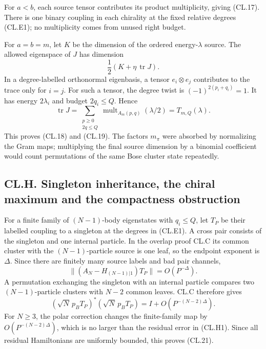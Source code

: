 For \(a<b\), each source tensor contributes its product multiplicity, giving (CL.17). There is one binary coupling in each chirality at the fixed relative degrees (CL.E1); no multiplicity comes from unused right budget.

For \(a=b=m\), let \(K\) be the dimension of the ordered energy-\(\lambda\) source. The allowed eigenspace of \(J\) has dimension \[
\frac12(K+\eta\,\operatorname{tr}J).
\] In a degree-labelled orthonormal eigenbasis, a tensor \(e_i\otimes e_j\) contributes to the trace only for \(i=j\). For such a tensor, the degree twist is \((-1)^{2(p_i+q_i)}=1\). It has energy \(2\lambda_i\) and budget \(2q_i\leq Q\). Hence \[
\operatorname{tr}J
=\sum_{\substack{p\geq0\\2q\leq Q}}
\operatorname{mult}_{A_m(p,q)}(\lambda/2)=T_{m,Q}(\lambda).
\tag{CL.G4}
\] This proves (CL.18) and (CL.19). The factors \(m_\pi\) were absorbed by normalizing the Gram maps; multiplying the final source dimension by a binomial coefficient would count permutations of the same Bose cluster state repeatedly.

\hypertarget{cl.h.-singleton-inheritance-the-chiral-maximum-and-the-compactness-obstruction}{%
\subsection{CL.H. Singleton inheritance, the chiral maximum and the compactness obstruction}\label{cl.h.-singleton-inheritance-the-chiral-maximum-and-the-compactness-obstruction}}

For a finite family of \((N-1)\)-body eigenstates with \(q_i\leq Q\), let \(T_P\) be their labelled coupling to a singleton at the degrees in (CL.E1). A cross pair consists of the singleton and one internal particle. In the overlap proof CL.C its common cluster with the \((N-1)\)-particle source is one leaf, so the endpoint exponent is \(\Delta\). Since there are finitely many source labels and bad pair channels, \[
\|(A_N-H_{(N-1)|1})T_P\|=O(P^{-\Delta}).
\tag{CL.H1}
\] A permutation exchanging the singleton with an internal particle compares two \((N-1)\)-particle clusters with \(N-2\) common leaves. CL.C therefore gives \[
(\sqrt N\,p_BT_P)^*(\sqrt N\,p_BT_P)
=I+O(P^{-(N-2)\Delta}).
\tag{CL.H2}
\] For \(N\geq3\), the polar correction changes the finite-family map by \(O(P^{-(N-2)\Delta})\), which is no larger than the residual error in (CL.H1). Since all residual Hamiltonians are uniformly bounded, this proves (CL.21).

